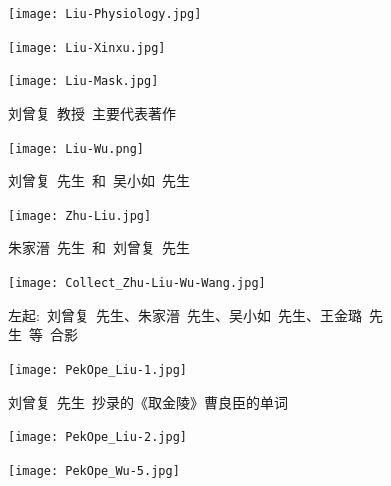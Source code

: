 \newpage
\begin{figure}[h!]
\centering
\vspace{-0.2in}
\texttt{[image: Liu-Physiology.jpg]}
\label{Liu-Physiology}
\end{figure}
\begin{figure}[hbtp!]
\hspace*{-0.4in}
\begin{minipage}[t]{0.48\textwidth}
	\centering
\texttt{[image: Liu-Xinxu.jpg]}
\end{minipage}
\hspace{0.3in}
\begin{minipage}[t]{0.48\textwidth}
	\centering
\texttt{[image: Liu-Mask.jpg]}
\end{minipage}
\vspace{1.0pt}
\caption*{\hei 刘曾复~教授~主要代表著作}
\label{Major_Works}
\end{figure}

\newpage
\begin{figure}[h!]
\centering
\texttt{[image: Liu-Wu.png]}
\caption*{\hei 刘曾复~先生~和~吴小如~先生}
\label{Collect_Liu_Wu}
\end{figure}

\newpage
\begin{figure}[h!]
\centering
\texttt{[image: Zhu-Liu.jpg]}
\caption*{\hei 朱家溍~先生~和~刘曾复~先生}
\label{Collect_Zhu_Wu}
\end{figure}

\begin{figure}[h!]
\centering
\texttt{[image: Collect\_Zhu-Liu-Wu-Wang.jpg]}
\caption*{\hei 左起:~刘曾复~先生、朱家溍~先生、吴小如~先生、王金璐~先生~等~合影}
\label{Collect_Liy_Zhu_Wu_Wang}
\end{figure}

\newpage
\begin{figure}[h!]
\centering
\vspace{-0.6in}
\texttt{[image: PekOpe\_Liu-1.jpg]}
\caption*{\hei 刘曾复~先生~抄录的《取金陵》曹良臣的单词}
\label{Liu-Script}
\end{figure}
\vspace{30pt}
\begin{figure}[hbtp!]
\hspace*{-0.5in}
\begin{minipage}[t]{0.53\textwidth}
	\centering
	\texttt{[image: PekOpe\_Liu-2.jpg]}
	\caption*{\hei \fontsize{8.5pt}{4.0pt}\selectfont{左:~刘曾复~先生~保存的部分说戏录音磁带}}
\end{minipage}
\hspace{0.6in}
\begin{minipage}[t]{0.43\textwidth}
	\centering
	\vspace{-3.7in}
	\texttt{[image: PekOpe\_Wu-5.jpg]}
	\caption*{\hei \fontsize{8.5pt}{4.0pt}\selectfont{右:吴小如~先生~保存的各类说戏录音磁带}}
\end{minipage}
\label{Records}
\end{figure}

